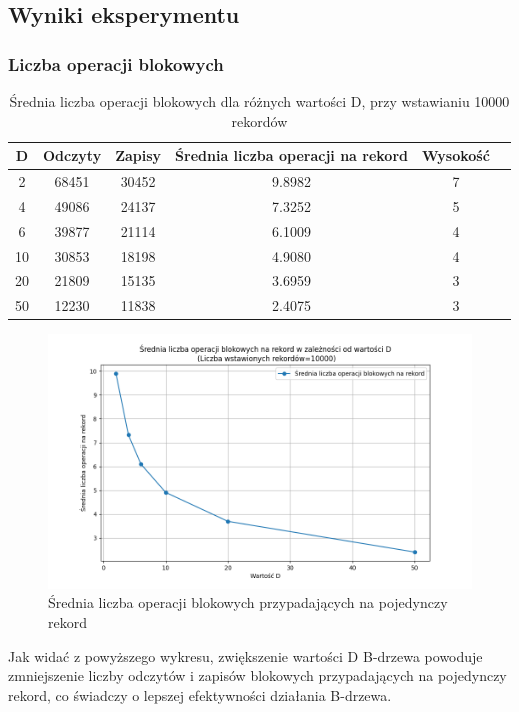 \documentclass[12pt]{article}
\begin{document}
\subsection{Wyniki eksperymentu}

\subsubsection{Liczba operacji blokowych}
\begin{table}[H]
\centering
\caption{Średnia liczba operacji blokowych dla różnych wartości D, przy wstawianiu 10000 rekordów}
\begin{tabular}{|c|c|c|c|c|c|}
\hline
D & Odczyty & Zapisy & Średnia liczba operacji na rekord & Wysokość \\
\hline
2 & 68451 & 30452 & 9.8982 & 7 \\
4 & 49086 & 24137 & 7.3252 & 5 \\
6 & 39877 & 21114 & 6.1009 & 4 \\
10 & 30853 & 18198 & 4.9080 & 4 \\
20 & 21809 & 15135 & 3.6959 & 3 \\
50 & 12230 & 11838 & 2.4075 & 3 \\
\hline
\end{tabular}
\end{table}

\begin{figure}[H]
    \centering
    \includegraphics[width=\textwidth]{../Plots/block_operations_per_record.png}
    \caption{Średnia liczba operacji blokowych przypadających na pojedynczy rekord}
    \label{fig:plot1}
\end{figure}

Jak widać z powyższego wykresu, zwiększenie wartości D B-drzewa powoduje 
zmniejszenie liczby odczytów i zapisów blokowych przypadających na pojedynczy rekord, 
co świadczy o lepszej efektywności działania B-drzewa.
\end{document}

